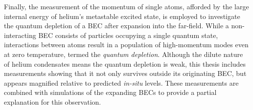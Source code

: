 Finally, the measurement of the momentum of single atoms, afforded by the large internal energy of helium's metastable excited state, is employed to investigate the quantum depletion of a BEC after expansion into the far-field.
While a non-interacting BEC consists of particles occupying a single quantum state, interactions between atoms result in a population of high-momentum modes even at zero temperature, termed the \emph{quantum depletion}.
Although the dilute nature of helium condensates means the quantum depletion is weak, this thesis includes measurements showing that it not only survives outside its originating BEC, but appears magnified relative to predicted \emph{in-situ} levels.
These measurements are combined with simulations of the expanding BECs to provide a partial explanation for this observation.



